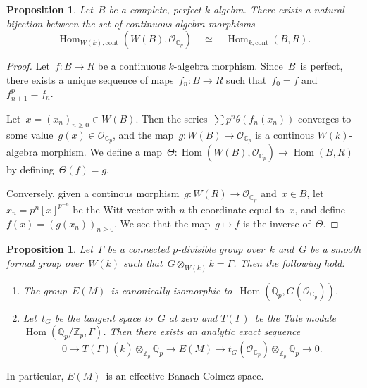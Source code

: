 \documentclass{article}
\newtheorem{prop}[thm]{Proposition}
\theoremstyle{definition}
\let\ro\mathcal \let\go\mathfrak
\DeclareMathOperator\Hom{Hom}
\def\O{\ro O}
\def\Cp{{ℂ_p}}
\begin{document}
\begin{prop}\label{prop:Hom-WB}
Let~$B$ be a complete, perfect $k$-algebra.
There exists a natural bijection between the set of continuous algebra
morphisms
\[ \Hom_{W(k),\mathrm{cont}} (W(B), \O_\Cp) \quad ≃ \quad
  \Hom_{k,\mathrm{cont}} (B, R).\]
\end{prop}%

\begin{proof}
Let~$f: B → R$ be a continuous $k$-algebra morphism. Since~$B$~is
perfect, there exists a unique sequence of maps~$f_n: B → R$ such
that~$f_0 = f$ and~$f_{n+1}^{p} = f_n$.

Let~$x = (x_n)_{n ≥ 0} ∈ W(B)$. Then the series~$∑ p^{n} θ(f_n(x_n))$
converges to some value~$g(x) ∈ \O_\Cp$, and the map~$g: W(B) → \O_\Cp$
is a continous $W(k)$-algebra morphism. We define a map~$Θ: \Hom (W(B),
\O_\Cp) → \Hom (B, R)$ by defining~$Θ(f) = g$.

Conversely, given a continous morphism~$g:  W(R) → \O_\Cp$ and~$x ∈ B$,
let~$x_n = p^{n} [x]^{p^{-n}}$ be the Witt vector with $n$-th coordinate
equal to~$x$, and define~$f(x) = (g(x_n))_{n ≥ 0}$. We see that the
map~$g ↦ f$ is the inverse of~$Θ$.
\end{proof}%


\begin{prop}\label{prop:EM-BCE}
Let~$Γ$ be a connected $p$-divisible group over~$k$ and~$G$ be a smooth
formal group over~$W(k)$ such that~$G ⊗_{W(k)} k = Γ$. Then the following
hold:
\begin{enumerate}
\item The group~$E(M)$~is canonically isomorphic to~$\Hom (ℚ_p, G(\O_\Cp))$.
\item Let~$t_G$ be the tangent space to~$G$ at zero and $T(Γ)$~be the
Tate module~$\Hom (ℚ_p/ℤ_p, Γ)$. Then there exists an
analytic exact sequence
\[ 0 → T(Γ)(\overline k) ⊗_{ℤ_p} ℚ_p → E(M) → t_G (\O_\Cp) ⊗_{ℤ_p} ℚ_p → 0. \]
\end{enumerate}
\end{prop}%

In particular, $E(M)$~is an effective Banach-Colmez space.
\end{document}
